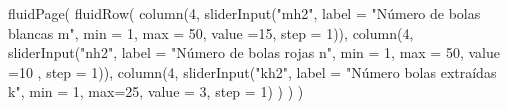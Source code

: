 \documentclass[
  letterpaper,
  DIV=11,
  numbers=noendperiod]{scrreprt}
\newenvironment{Shaded}{\begin{snugshade}}{\end{snugshade}}
\newcommand{\AttributeTok}[1]{\textcolor[rgb]{0.40,0.45,0.13}{#1}}
\newcommand{\DecValTok}[1]{\textcolor[rgb]{0.68,0.00,0.00}{#1}}
\newcommand{\FunctionTok}[1]{\textcolor[rgb]{0.28,0.35,0.67}{#1}}
\newcommand{\NormalTok}[1]{\textcolor[rgb]{0.00,0.23,0.31}{#1}}
\newcommand{\StringTok}[1]{\textcolor[rgb]{0.13,0.47,0.30}{#1}}
\begin{document}
\begin{Shaded}
\begin{Highlighting}[]
\FunctionTok{fluidPage}\NormalTok{(}
\FunctionTok{fluidRow}\NormalTok{(}
  \FunctionTok{column}\NormalTok{(}\DecValTok{4}\NormalTok{,}
         \FunctionTok{sliderInput}\NormalTok{(}\StringTok{"mh2"}\NormalTok{, }\AttributeTok{label =} \StringTok{"Número de bolas blancas m"}\NormalTok{,}
              \AttributeTok{min =} \DecValTok{1}\NormalTok{, }\AttributeTok{max =} \DecValTok{50}\NormalTok{, }\AttributeTok{value =}\DecValTok{15}\NormalTok{, }\AttributeTok{step =} \DecValTok{1}\NormalTok{)),}
  \FunctionTok{column}\NormalTok{(}\DecValTok{4}\NormalTok{,}
         \FunctionTok{sliderInput}\NormalTok{(}\StringTok{"nh2"}\NormalTok{, }\AttributeTok{label =} \StringTok{"Número de bolas rojas n"}\NormalTok{,}
              \AttributeTok{min =} \DecValTok{1}\NormalTok{, }\AttributeTok{max =} \DecValTok{50}\NormalTok{, }\AttributeTok{value =}\DecValTok{10}\NormalTok{ , }\AttributeTok{step =} \DecValTok{1}\NormalTok{)),}
  \FunctionTok{column}\NormalTok{(}\DecValTok{4}\NormalTok{,}
          \FunctionTok{sliderInput}\NormalTok{(}\StringTok{"kh2"}\NormalTok{, }\AttributeTok{label =} \StringTok{"Número bolas extraídas k"}\NormalTok{,}
                     \AttributeTok{min =} \DecValTok{1}\NormalTok{, }\AttributeTok{max=}\DecValTok{25}\NormalTok{, }\AttributeTok{value =} \DecValTok{3}\NormalTok{, }\AttributeTok{step =} \DecValTok{1}\NormalTok{)}
\NormalTok{         )}
\NormalTok{  )}
\NormalTok{)}


\end{Highlighting}
\end{Shaded}
\end{document}
